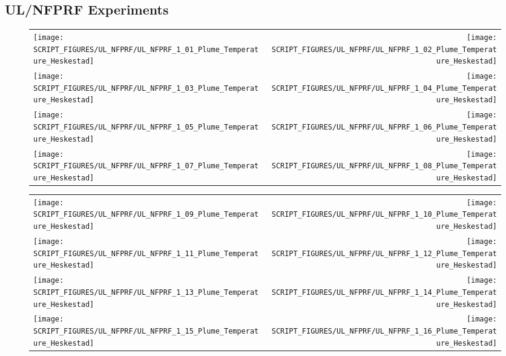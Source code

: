 \clearpage

\subsection{UL/NFPRF Experiments}

\begin{figure}[!ht]
\begin{tabular*}{\textwidth}{l@{\extracolsep{\fill}}r}
\texttt{[image: SCRIPT\_FIGURES/UL\_NFPRF/UL\_NFPRF\_1\_01\_Plume\_Temperature\_Heskestad]} &
\texttt{[image: SCRIPT\_FIGURES/UL\_NFPRF/UL\_NFPRF\_1\_02\_Plume\_Temperature\_Heskestad]} \\
\texttt{[image: SCRIPT\_FIGURES/UL\_NFPRF/UL\_NFPRF\_1\_03\_Plume\_Temperature\_Heskestad]} &
\texttt{[image: SCRIPT\_FIGURES/UL\_NFPRF/UL\_NFPRF\_1\_04\_Plume\_Temperature\_Heskestad]} \\
\texttt{[image: SCRIPT\_FIGURES/UL\_NFPRF/UL\_NFPRF\_1\_05\_Plume\_Temperature\_Heskestad]} &
\texttt{[image: SCRIPT\_FIGURES/UL\_NFPRF/UL\_NFPRF\_1\_06\_Plume\_Temperature\_Heskestad]} \\
\texttt{[image: SCRIPT\_FIGURES/UL\_NFPRF/UL\_NFPRF\_1\_07\_Plume\_Temperature\_Heskestad]} &
\texttt{[image: SCRIPT\_FIGURES/UL\_NFPRF/UL\_NFPRF\_1\_08\_Plume\_Temperature\_Heskestad]}
\end{tabular*}
\end{figure}

\begin{figure}[!ht]
\begin{tabular*}{\textwidth}{l@{\extracolsep{\fill}}r}
\texttt{[image: SCRIPT\_FIGURES/UL\_NFPRF/UL\_NFPRF\_1\_09\_Plume\_Temperature\_Heskestad]} &
\texttt{[image: SCRIPT\_FIGURES/UL\_NFPRF/UL\_NFPRF\_1\_10\_Plume\_Temperature\_Heskestad]} \\
\texttt{[image: SCRIPT\_FIGURES/UL\_NFPRF/UL\_NFPRF\_1\_11\_Plume\_Temperature\_Heskestad]} &
\texttt{[image: SCRIPT\_FIGURES/UL\_NFPRF/UL\_NFPRF\_1\_12\_Plume\_Temperature\_Heskestad]} \\
\texttt{[image: SCRIPT\_FIGURES/UL\_NFPRF/UL\_NFPRF\_1\_13\_Plume\_Temperature\_Heskestad]} &
\texttt{[image: SCRIPT\_FIGURES/UL\_NFPRF/UL\_NFPRF\_1\_14\_Plume\_Temperature\_Heskestad]} \\
\texttt{[image: SCRIPT\_FIGURES/UL\_NFPRF/UL\_NFPRF\_1\_15\_Plume\_Temperature\_Heskestad]} &
\texttt{[image: SCRIPT\_FIGURES/UL\_NFPRF/UL\_NFPRF\_1\_16\_Plume\_Temperature\_Heskestad]}
\end{tabular*}
\end{figure}

